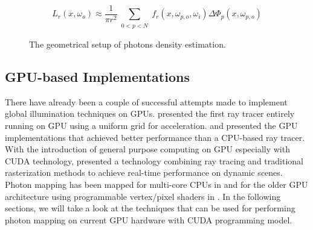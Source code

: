 \begin{equation}
L_r(x, \omega_{o}) \approx \frac{1}{\pi r^{2}}\sum_{\substack{0<p<N}}f_{r}(x, \omega_{p, o}, \omega_{i})\Delta \Phi_{p}(x,\omega_{p, o})
\label{eq:photon_estimate}
\end{equation}

\begin{figure}[ftp]
    \centering
    \renewcommand{\thefigure}{\thechapter.\arabic{figure}}
    \caption[Photon Density Estimation Model]{The geometrical setup of photons density estimation.}
    \label{fig:photon_density_estimate}
\end{figure}

\subsection{GPU-based Implementations}
There have already been a couple of successful attempts made to implement global illumination techniques on GPUs. \citeauthor{Purcell:2002:RTP:566654.566640} \cite{Purcell:2002:RTP:566654.566640} presented the first ray tracer entirely running on GPU using a uniform grid for acceleration. \cite{Horn:2007:IKT:1230100.1230129} and \cite{Popov2007} presented the GPU implementations that achieved better performance than a CPU-based ray tracer. With the introduction of general purpose computing on GPU especially with CUDA technology, \citeauthor{Luebke2008} \cite{Luebke2008} presented a technology combining ray tracing and traditional rasterization methods to achieve real-time performance on dynamic scenes.
Photon mapping has been mapped for multi-core CPUs in \cite{gunther:realtime} and for the older GPU architecture using programmable vertex/pixel shaders in \cite{Purcell:2005:PMP:1198555.1198797}. In the following sections, we will take a look at the techniques that can
be used for performing photon mapping on current GPU hardware with CUDA programming model.


